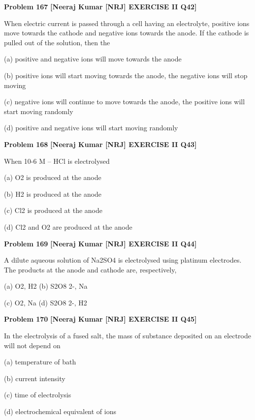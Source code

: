 \begin{problembox}
\textbf{Problem 167} \hfill \textbf{[Neeraj Kumar [NRJ] EXERCISE II Q42]}
\label{q:ext-nrj_all_questions-167}

When electric current is passed through a cell 
having an electrolyte, positive ions move towards 
the cathode and negative ions towards the anode. 
If the cathode is pulled out of the solution, 
then the
 
 (a)  positive and negative ions will move towards 
the anode
 
 (b)  positive ions will start moving towards the 
anode, the negative ions will stop moving
 
 (c)  negative ions will continue to move towards 
the anode, the positive ions will start moving 
randomly
 
 (d)  positive and negative ions will start moving 
randomly
\end{problembox}

\begin{problembox}
\textbf{Problem 168} \hfill \textbf{[Neeraj Kumar [NRJ] EXERCISE II Q43]}
\label{q:ext-nrj_all_questions-168}

When 10-6 M -- HCl is electrolysed
 
 (a) O2 is produced at the anode
 
 (b) H2 is produced at the anode
 
 (c) Cl2 is produced at the anode
 
 (d) Cl2 and O2 are produced at the anode
\end{problembox}

\begin{problembox}
\textbf{Problem 169} \hfill \textbf{[Neeraj Kumar [NRJ] EXERCISE II Q44]}
\label{q:ext-nrj_all_questions-169}

A dilute aqueous solution of Na2SO4 is electrolysed 
using platinum electrodes. The products at the 
anode and cathode are, respectively,
 
 (a) O2, H2 
(b) S2O8
2-, Na
 
 (c) O2, Na 
(d) S2O8
2-, H2
\end{problembox}

\begin{problembox}
\textbf{Problem 170} \hfill \textbf{[Neeraj Kumar [NRJ] EXERCISE II Q45]}
\label{q:ext-nrj_all_questions-170}

In the electrolysis of a fused salt, the mass of 
substance deposited on an electrode will not 
depend on
 
 (a) temperature of bath
 
 (b) current intensity
 
 (c) time of electrolysis
 
 (d) electrochemical equivalent of ions
\end{problembox}

